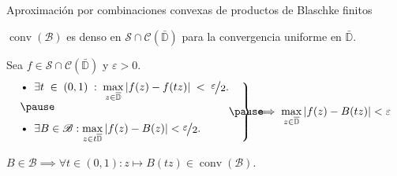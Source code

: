 \documentclass[
    aspectratio=169,
]{beamer}
\begin{document}
\begin{frame}{Aproximación por combinaciones convexas de productos de Blaschke finitos}
    
    \begin{teo}[Fisher]
        $\operatorname{conv} \left(\mathscr{B}\right)$ es denso en $\mathscr{S} \cap \mathcal{C}\left(\bar{\mathbb{D}}\right)$ para la convergencia uniforme en $\bar{\mathbb{D}}$.
    \end{teo}
    \pause
    \begin{dem}[Idea]
        Sea $f \in \mathscr{S} \cap \mathcal{C}\left(\bar{\mathbb{D}}\right)$ y $\varepsilon > 0$.
        \[
        \left.\begin{minipage}{0.55\textwidth}
        \begin{itemize}[wide]
            \item $\ds \exists t \in (0, 1) : \max_{z \in \bar{\mathbb{D}}} \abs{f(z) - f(tz)} < \sfrac{\varepsilon}{2}$.
            \pause
            \item $\ds \exists B \in \mathscr{B} : \max_{z \in t\bar{\mathbb{D}}} \abs{f(z) - B(z)} < \sfrac{\varepsilon}{2}$.
        \end{itemize}
        \end{minipage}
        \pause
        \!\!\!\!\!\!\!\!\!\!\!\!\right\}
        \implies \max_{z \in \bar{\mathbb{D}}} \abs{f(z) - B(tz)} < \varepsilon
        \]

        \pause
        \vspace{-\baselineskip}
        \hfill\qedsymbol
    \end{dem}

    \begin{lem}[Auxiliar]
        $B \in \mathscr{B} \implies \forall t \in (0, 1) : z \mapsto B(tz) \in \operatorname{conv} \left(\mathscr{B}\right)$.
    \end{lem}


\end{frame}
\end{document}
